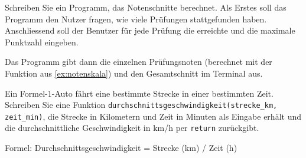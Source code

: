 \begin{myexercise}
	Schreiben Sie ein Programm, das Notenschnitte berechnet. Als Erstes soll das Programm den Nutzer fragen, wie viele Prüfungen stattgefunden haben. Anschliessend soll der Benutzer für jede Prüfung die erreichte und die maximale Punktzahl eingeben.

	Das Programm gibt dann die einzelnen Prüfungsnoten (berechnet mit der Funktion aus \cref{ex:notenskala}) und den Gesamtschnitt im Terminal aus.
	\begin{myanswer}
		
	\end{myanswer}

\end{myexercise}


\begin{myexercise}\label{ex:f1}
	Ein Formel-1-Auto fährt eine bestimmte Strecke in einer bestimmten Zeit. Schreiben Sie eine Funktion \lstinline|durchschnittsgeschwindigkeit(strecke_km, zeit_min)|, die Strecke in Kilometern und Zeit in Minuten als Eingabe erhält und die durchschnittliche Geschwindigkeit in km/h per \lstinline|return| zurückgibt.

	Formel: Durchschnittsgeschwindigkeit = Strecke (km) / Zeit (h)

	\begin{myanswer}
		
	\end{myanswer}
\end{myexercise}

